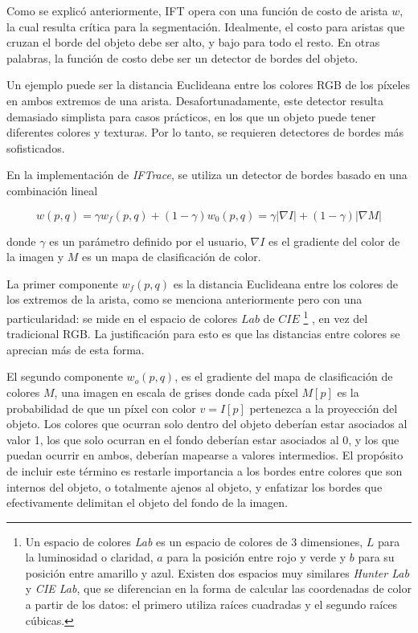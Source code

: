 \documentclass[a4paper,10pt]{article}
\begin{document}
Como se explicó anteriormente, IFT opera con una función de costo de arista
$w$, la cual resulta crítica para la segmentación. Idealmente, el costo
para aristas que cruzan el borde del objeto debe ser alto, y bajo para todo
el resto. En otras palabras, la función de costo debe ser un detector
de bordes del objeto.

Un ejemplo puede ser la distancia Euclideana entre los colores RGB de los píxeles
en ambos extremos de una arista. Desafortunadamente, este detector resulta demasiado
simplista para casos prácticos, en los que un objeto puede tener diferentes colores y
texturas. Por lo tanto, se requieren detectores de bordes más sofisticados.

En la implementación de \textit{IFTrace}, se utiliza un detector de bordes basado en
una combinación lineal

\begin{equation}
   \label{eq:IFTrace-edge-detector}
   w(p,q) = \gamma w_{f}(p,q) + (1 - \gamma)w_{0}(p,q) = \gamma |\nabla I| + (1 - \gamma)|\nabla M|
\end{equation}

donde $\gamma$ es un parámetro definido por el usuario, $\nabla I$ es el gradiente
del color de la imagen y $M$ es un mapa de clasificación de color.

La primer componente $w_{f}(p,q)$ es la distancia Euclideana entre los colores de
los extremos de la arista, como se menciona anteriormente pero con una particularidad:
se mide en el espacio de colores $Lab$ de $CIE$
\footnote{
Un espacio de colores \textit{Lab} es un espacio de colores de 3 dimensiones, $L$ para la luminosidad o claridad, $a$ para la posición entre rojo y verde y
$b$ para su posición entre amarillo y azul. Existen dos espacios muy similares \textit{Hunter Lab} y \textit{CIE Lab}, que se diferencian en la forma de
calcular las coordenadas de color a partir de los datos: el primero utiliza raíces cuadradas y el segundo raíces cúbicas.}
, en vez del tradicional RGB. La
justificación para esto es que las distancias entre colores se aprecian más de
esta forma. %

El segundo componente $w_{o}(p,q)$, es el gradiente del mapa de clasificación
de colores $M$, una imagen en escala de grises donde cada píxel $M[p]$ es
la probabilidad de que un píxel con color $v=I[p]$ pertenezca a la proyección
del objeto. Los colores que ocurran solo dentro del objeto deberían estar
asociados al valor 1, los que solo ocurran en el fondo deberían estar
asociados al 0, y los que puedan ocurrir en ambos, deberían mapearse a
valores intermedios. El propósito de incluir este término es restarle
importancia a los bordes entre colores que son internos del objeto, o
totalmente ajenos al objeto, y enfatizar los bordes que efectivamente
delimitan el objeto del fondo de la imagen.
\end{document}
